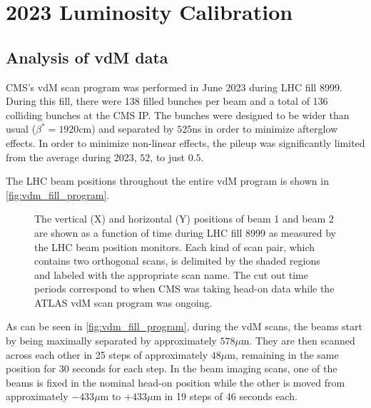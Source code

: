 \chapter{2023 Luminosity Calibration}
\label{ch:2023_luminosity_calibration}

\section{Analysis of vdM data}

CMS's vdM scan program was performed in June 2023 during LHC fill 8999. During this fill, there were 138 filled bunches per beam and a total of 136 colliding bunches at the CMS IP. The bunches were designed to be wider than usual ($\beta^{*} = 1920$cm) and separated by $525$ns in order to minimize afterglow effects. In order to minimize non-linear effects, the pileup was significantly limited from the average during 2023, $52$, to just $0.5$.

The LHC beam positions throughout the entire vdM program is shown in \autoref{fig:vdm_fill_program}.

\begin{figure}[!htb]
	\centering
	\caption[Beam positions during fill 8999]{The vertical (X) and horizontal (Y) positions of beam 1 and beam 2 are shown as a function of time during LHC fill 8999 as measured by the LHC beam position monitors. Each kind of scan pair, which contains two orthogonal scans, is delimited by the shaded regions and labeled with the appropriate scan name. The cut out time periods correspond to when CMS was taking head-on data while the ATLAS vdM scan program was ongoing.}
	\label{fig:vdm_fill_program}
\end{figure}

As can be seen in \autoref{fig:vdm_fill_program}, during the vdM scans, the beams start by being maximally separated by approximately $578 \mu$m. They are then scanned across each other in 25 steps of approximately $48 \mu$m, remaining in the same position for 30 seconds for each step. In the beam imaging scans, one of the beams is fixed in the nominal head-on position while the other is moved from approximately $-433 \mu$m to $+433 \mu$m in 19 steps of 46 seconds each.

